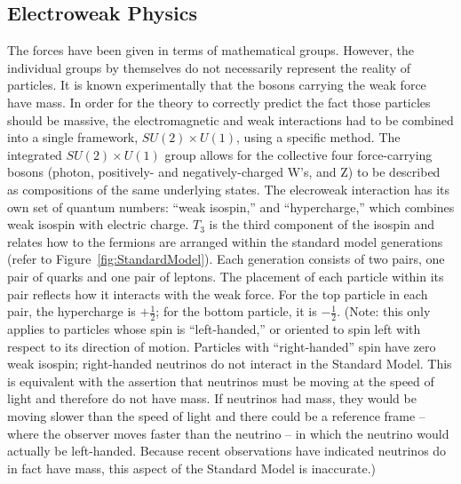 \subsection{Electroweak Physics}
\label{theory:EWK}
The forces 
have been given in terms 
of mathematical groups.  
However, the individual groups by themselves 
do not necessarily represent the reality of particles.  
It is known experimentally that the bosons carrying 
the weak force have mass.  
In order for the theory to correctly predict the 
fact those particles should be massive, 
the electromagnetic and weak interactions had to be combined 
into a single framework, 
$SU(2) \times U(1)$, using a specific method.  
The integrated $SU(2) \times U(1)$ group 
allows for the collective four force-carrying bosons 
(photon, positively- and negatively-charged W's, and Z) 
to be described as compositions of the same underlying states.  
The elecroweak interaction has its own set of quantum 
numbers: ``weak isospin,'' and ``hypercharge,'' 
which combines weak isospin with electric charge.  
$T_3$ is the third component of the isospin 
and relates how to the fermions are arranged 
within the standard model generations 
(refer to Figure~\ref{fig:StandardModel}).  
Each generation consists of two pairs, 
one pair of quarks and one pair of leptons.  
The placement of each particle within its pair 
reflects how it interacts with the weak force.  
For the top particle in each pair, the hypercharge 
is $+\frac{1}{2}$; 
for the bottom particle, it is $-\frac{1}{2}$.  
(Note: this only applies to particles whose spin 
is ``left-handed,'' 
or oriented to spin left with respect to its direction of motion.  
Particles with ``right-handed'' spin have zero weak isospin; 
right-handed neutrinos do not interact in the Standard Model.  
This is equivalent with the assertion that neutrinos 
must be moving at the speed of light and therefore 
do not have mass. 
If neutrinos had mass, 
they would be moving slower than the speed of light 
and there could be a reference frame -- 
where the observer moves faster than the neutrino -- 
in which the neutrino would actually be left-handed.  
Because recent observations have indicated neutrinos %
do in fact have mass, 
this aspect of the Standard Model is inaccurate.)  

